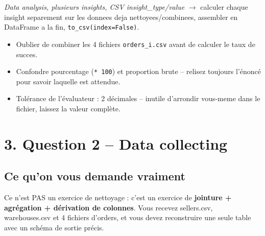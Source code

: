 \documentclass[11pt]{article}
\newcommand{\exhead}[1]{\subsection{#1}}
\begin{document}
\begin{pat}
\emph{\og Data analysis, plusieurs insights, CSV insight\_type/value \fg}
$\to$ calculer chaque insight separement sur les donnees deja
nettoyees/combinees, assembler en DataFrame a la fin,
\texttt{to\_csv(index=False)}.
\end{pat}

\begin{trap}
\begin{itemize}[nosep]
  \item Oublier de combiner les 4 fichiers \texttt{orders\_i.csv} avant
        de calculer le taux de succes.
  \item Confondre pourcentage (\texttt{* 100}) et proportion brute --
        relisez toujours l'\'enonc\'e pour savoir laquelle est attendue.
  \item Tol\'erance de l'\'evaluateur : 2 d\'ecimales -- inutile
        d'arrondir vous-meme dans le fichier, laissez la valeur compl\`ete.
\end{itemize}
\end{trap}

\section{3. Question 2 -- Data collecting}

\exhead{Ce qu'on vous demande vraiment}
Ce n'est PAS un exercice de nettoyage : c'est un exercice de
\textbf{jointure + agr\'egation + d\'erivation de colonnes}. Vous recevez
sellers.csv, warehouses.csv et 4 fichiers
d'orders, et vous devez reconstruire une seule table
avec un sch\'ema de sortie pr\'ecis.
\end{document}
